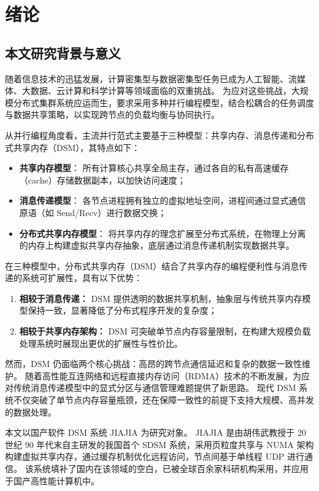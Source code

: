 \chapter{绪论}\label{chap:introduction}{

  \section{本文研究背景与意义}
  随着信息技术的迅猛发展，计算密集型与数据密集型任务已成为人工智能、流媒体、大数据、云计算和科学计算等领域面临的双重挑战。
  为应对这些挑战，大规模分布式集群系统应运而生，要求采用多种并行编程模型，结合松耦合的任务调度与数据共享策略，以实现跨节点的负载均衡与协同执行。

  从并行编程角度看，主流并行范式主要基于三种模型：共享内存、消息传递和分布式共享内存（DSM），其特点如下：
  \begin{itemize}
    \item \textbf{共享内存模型}： 所有计算核心共享全局主存，通过各自的私有高速缓存（cache）存储数据副本，以加快访问速度；
    \item \textbf{消息传递模型}： 各节点进程拥有独立的虚拟地址空间，进程间通过显式通信原语（如 Send/Recv）进行数据交换；
    \item \textbf{分布式共享内存模型}： 将共享内存的理念扩展至分布式系统，在物理上分离的内存上构建虚拟共享内存抽象，底层通过消息传递机制实现数据共享。
  \end{itemize}

  在三种模型中，分布式共享内存（DSM）结合了共享内存的编程便利性与消息传递的系统可扩展性，具有以下优势：
  \begin{enumerate}[leftmargin=1em, align=left]
    \item \textbf{相较于消息传递：} DSM 提供透明的数据共享机制，抽象层与传统共享内存模型保持一致，显著降低了分布式程序开发的复杂度；
    \item \textbf{相较于共享内存架构：} DSM 可突破单节点内存容量限制，在构建大规模负载处理系统时展现出更优的扩展性与性价比。
  \end{enumerate}

  然而，DSM 仍面临两个核心挑战：高昂的跨节点通信延迟和复杂的数据一致性维护。
  随着高性能互连网络和远程直接内存访问（RDMA）技术的不断发展，为应对传统消息传递模型中的显式分区与通信管理难题提供了新思路。
  现代 DSM 系统不仅突破了单节点内存容量瓶颈，还在保障一致性的前提下支持大规模、高并发的数据处理。

  本文以国产软件 DSM 系统 JIAJIA\citep{huweiwu2001sma,huweiwu2024ca,1999huweiwuJIAJIA} 为研究对象。
  JIAJIA 是由胡伟武教授于 20 世纪 90 年代末自主研发的我国首个 SDSM 系统，采用页粒度共享与 NUMA 架构构建虚拟共享内存，通过缓存机制优化远程访问，节点间基于单线程 UDP 进行通信。
  该系统填补了国内在该领域的空白，已被全球百余家科研机构采用，并应用于国产高性能计算机中。

}
